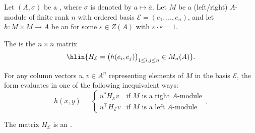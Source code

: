 \begin{definition} \label{definition:matrix_of_an_epsilon_hermitian_form_on_a_free_module_over_a_ring_with_involution}
    Let $(A,\sigma)$ be a , where $\sigma$ is denoted by $a \mapsto \overline{a}$. Let $M$ be a  (left/right) $A$-module of finite rank $n$ with ordered basis $\mathcal{E} = (e_1,\ldots,e_n)$, and let $h: M \times M \to A$ be an  for some $\varepsilon \in Z(A)$ with $\varepsilon \cdot \overline{\varepsilon} = 1$. 

    The  is the $n \times n$ matrix
    $$\hlin{H_{\mathcal{E}} = \bigl( h(e_i, e_j) \bigr)_{1 \leq i,j \leq n} \in M_n(A)}.$$

    For any column vectors $u,v \in A^n$ representing elements of $M$ in the basis $\mathcal{E}$, the form evaluates in one of the following inequivalent ways:
    $$h(x,y) = \begin{cases} u^* H_{\mathcal{E}} v &\text{if } M \text{ is a right } A \text{-module} \\  u^\top H_{\mathcal{E}} v &\text{if } M \text{ is a left } A \text{-module} \end{cases},$$

    The matrix $H_{\mathcal{E}}$ is an .
\end{definition}